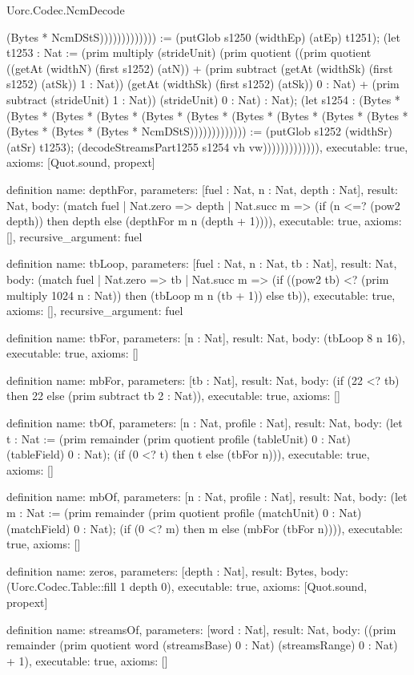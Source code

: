 \begin{lexlean}{Uorc.Codec.NcmDecode}
\begin{semanticmodule}
{(Bytes * NcmDStS))))))))))))) := (putGlob s1250 (widthEp) (atEp) t1251); (let t1253 : Nat := (prim multiply (strideUnit) (prim quotient ((prim quotient ((getAt (widthN) (first s1252) (atN)) + (prim subtract (getAt (widthSk) (first s1252) (atSk)) 1 : Nat)) (getAt (widthSk) (first s1252) (atSk)) 0 : Nat) + (prim subtract (strideUnit) 1 : Nat)) (strideUnit) 0 : Nat) : Nat); (let s1254 : (Bytes * (Bytes * (Bytes * (Bytes * (Bytes * (Bytes * (Bytes * (Bytes * (Bytes * (Bytes * (Bytes * (Bytes * (Bytes * NcmDStS))))))))))))) := (putGlob s1252 (widthSr) (atSr) t1253); (decodeStreamsPart1255 s1254 vh vw))))))))))))),
  executable: true,
  axioms: [Quot.sound, propext]
}

definition{
  name: depthFor,
  parameters: [fuel : Nat, n : Nat, depth : Nat],
  result: Nat,
  body: (match fuel
    | Nat.zero => depth
    | Nat.succ m => (if (n <=? (pow2 depth)) then depth else (depthFor m n (depth + 1)))),
  executable: true,
  axioms: [],
  recursive_argument: fuel
}

definition{
  name: tbLoop,
  parameters: [fuel : Nat, n : Nat, tb : Nat],
  result: Nat,
  body: (match fuel
    | Nat.zero => tb
    | Nat.succ m => (if ((pow2 tb) <? (prim multiply 1024 n : Nat)) then (tbLoop m n (tb + 1)) else tb)),
  executable: true,
  axioms: [],
  recursive_argument: fuel
}

definition{
  name: tbFor,
  parameters: [n : Nat],
  result: Nat,
  body: (tbLoop 8 n 16),
  executable: true,
  axioms: []
}

definition{
  name: mbFor,
  parameters: [tb : Nat],
  result: Nat,
  body: (if (22 <? tb) then 22 else (prim subtract tb 2 : Nat)),
  executable: true,
  axioms: []
}

definition{
  name: tbOf,
  parameters: [n : Nat, profile : Nat],
  result: Nat,
  body: (let t : Nat := (prim remainder (prim quotient profile (tableUnit) 0 : Nat) (tableField) 0 : Nat); (if (0 <? t) then t else (tbFor n))),
  executable: true,
  axioms: []
}

definition{
  name: mbOf,
  parameters: [n : Nat, profile : Nat],
  result: Nat,
  body: (let m : Nat := (prim remainder (prim quotient profile (matchUnit) 0 : Nat) (matchField) 0 : Nat); (if (0 <? m) then m else (mbFor (tbFor n)))),
  executable: true,
  axioms: []
}

definition{
  name: zeros,
  parameters: [depth : Nat],
  result: Bytes,
  body: (Uorc.Codec.Table::fill 1 depth 0),
  executable: true,
  axioms: [Quot.sound, propext]
}

definition{
  name: streamsOf,
  parameters: [word : Nat],
  result: Nat,
  body: ((prim remainder (prim quotient word (streamsBase) 0 : Nat) (streamsRange) 0 : Nat) + 1),
  executable: true,
  axioms: []
}


\end{semanticmodule}
\end{lexlean}
